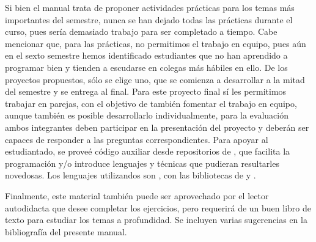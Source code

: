 Si bien el manual trata de proponer actividades prácticas para los temas más importantes del semestre, nunca se han dejado todas las prácticas durante el curso, pues sería demasiado trabajo para ser completado a tiempo.   Cabe mencionar que, para las prácticas, no permitimos el trabajo en equipo, pues aún en el sexto semestre hemos identificado estudiantes que no han aprendido a programar bien y tienden a escudarse en colegas más hábiles en ello.  De los proyectos propuestos, sólo se elige uno, que se comienza a desarrollar a la mitad del semestre y se entrega al final.  Para este proyecto final sí les permitimos trabajar en parejas, con el objetivo de también fomentar el trabajo en equipo, aunque también es posible desarrollarlo individualmente, para la evaluación ambos integrantes deben participar en la presentación del proyecto y deberán ser capaces de responder a las preguntas correspondientes.  Para apoyar al estudiantado, se proveé código auxiliar desde repositorios de , que facilita la programación y/o introduce lenguajes y técnicas que pudieran resultarles novedosas.  Los lenguajes utilizandos son \Java, con las bibliotecas de  y \Python.

Finalmente, este material también puede ser aprovechado por el lector autodidacta que desee completar los ejercicios, pero requerirá de un buen libro de texto para estudiar los temas a profundidad.  Se incluyen varias sugerencias en la bibliografía del presente manual.

